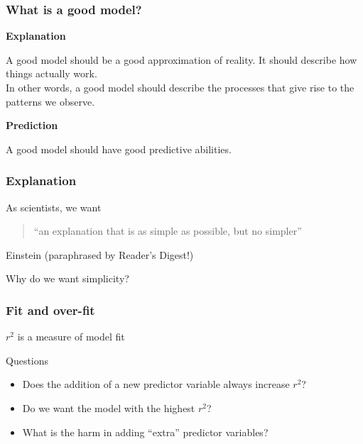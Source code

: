 \documentclass[color=usenames,dvipsnames]{beamer}\usepackage[]{graphicx}\usepackage[]{color}
\begin{document}
\begin{frame}
  \frametitle{What is a good model?}
  {\bf Explanation \par}
  A good model should be a good approximation of reality. It should
  describe how things actually work. \\
  \pause
  \vspace{0.25cm}
  In other words, a good model should describe the processes that give
  rise to the patterns we observe. \\   
  \pause
  \vspace{0.5cm}
  {\bf Prediction \par}
  A good model should have good predictive abilities. 
\end{frame}



\begin{frame}
  \frametitle{Explanation}
  \large
As scientists, we want
\begin{quote}
  ``an explanation that is as simple as possible, but no simpler''
\end{quote}
{\small \flushright Einstein (paraphrased by Reader's Digest!) \par}
\pause
\vspace{1cm}
Why do we want simplicity? %
\end{frame}




\begin{frame}
  \frametitle{Fit and over-fit}
  \large
  {$r^2$ is a measure of model fit \par}
  \vspace{1cm}
  \pause
  {Questions}
  \begin{itemize}%
    \item<2-> Does the addition of a new predictor variable always
      increase $r^2$?
    \item<3-> Do we want the model with the highest $r^2$?
    \item<4-> What is the harm in adding ``extra'' predictor variables?
  \end{itemize}
  \vfill
\end{frame}
\end{document}
